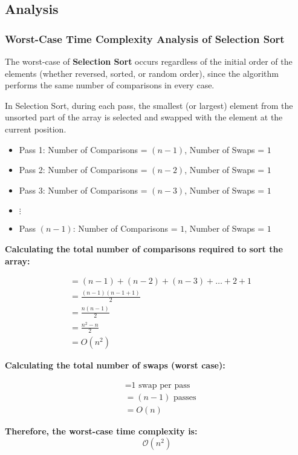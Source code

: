 \subsection{Analysis}

\subsubsection{Worst-Case Time Complexity Analysis of Selection Sort}
The worst-case of \textbf{Selection Sort} occurs regardless of the initial order of the elements (whether reversed, sorted, or random order), since the algorithm performs the same number of comparisons in every case.

In Selection Sort, during each pass, the smallest (or largest) element from the unsorted part of the array is selected and swapped with the element at the current position.

\begin{itemize}
    \item Pass 1: Number of Comparisons = $(n-1)$, Number of Swaps = $1$
    \item Pass 2: Number of Comparisons = $(n-2)$, Number of Swaps = $1$
    \item Pass 3: Number of Comparisons = $(n-3)$, Number of Swaps = $1$
    \item[] $\vdots$
    \item Pass $(n-1)$: Number of Comparisons = $1$, Number of Swaps = $1$
\end{itemize}

\textbf{Calculating the total number of comparisons required to sort the array:}
\begin{center}
    \begin{align*}
        &= (n - 1) + (n - 2) + (n - 3) + \dots + 2 + 1 \\
        &= \frac{(n - 1)(n - 1 + 1)}{2} \\
        &= \frac{n(n - 1)}{2} \\
        &= \frac{n^2 - n}{2} \\
        &= \textbf{\(O(n^2)\)}
    \end{align*}
\end{center}

\textbf{Calculating the total number of swaps (worst case):}
\begin{center}
    \begin{align*}
        &= \text{1 swap per pass} \\
        &= (n - 1) \text{ passes} \\
        &= \textbf{\(O(n)\)}
    \end{align*}
\end{center}

\bigskip

\noindent
\textbf{Therefore, the worst-case time complexity is:}
\[
\mathcal{O}(n^2)
\]
